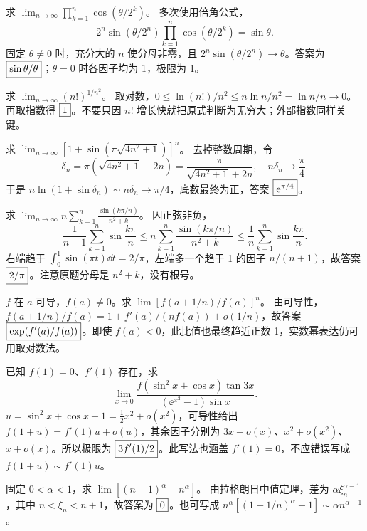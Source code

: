 求 $\lim_{n\to\infty}\prod_{k=1}^n\cos(\theta/2^k)$。
\sol 多次使用倍角公式，
\[2^n\sin(\theta/2^n)\prod_{k=1}^n\cos(\theta/2^k)=\sin\theta.\]
固定 $\theta\ne0$ 时，充分大的 $n$ 使分母非零，且 $2^n\sin(\theta/2^n)\to\theta$。答案为 $\boxed{\sin\theta/\theta}$；$\theta=0$ 时各因子均为 1，极限为 1。

求 $\lim_{n\to\infty}(n!)^{1/n^2}$。
\sol 取对数，$0\le \ln(n!)/n^2\le n\ln n/n^2=\ln n/n\to0$。再取指数得 $\boxed{1}$。不要只因 $n!$ 增长快就把原式判断为无穷大；外部指数同样关键。

求 $\lim_{n\to\infty}[1+\sin(\pi\sqrt{4n^2+1})]^n$。
\sol 去掉整数周期，令
\[\delta_n=\pi(\sqrt{4n^2+1}-2n)=\frac\pi{\sqrt{4n^2+1}+2n},\quad n\delta_n\to\frac\pi4.\]
于是 $n\ln(1+\sin\delta_n)\sim n\delta_n\to\pi/4$，底数最终为正，答案 $\boxed{\mathrm e^{\pi/4}}$。

求 $\displaystyle\lim_{n\to\infty}n\sum_{k=1}^n\frac{\sin(k\pi/n)}{n^2+k}$。
\sol 因正弦非负，
\[\frac1{n+1}\sum_{k=1}^n\sin\frac{k\pi}n
\le n\sum_{k=1}^n\frac{\sin(k\pi/n)}{n^2+k}
\le\frac1n\sum_{k=1}^n\sin\frac{k\pi}n.\]
右端趋于 $\int_0^1\sin(\pi t)\dd t=2/\pi$，左端多一个趋于 1 的因子 $n/(n+1)$，故答案 $\boxed{2/\pi}$。注意原题分母是 $n^2+k$，没有根号。

$f$ 在 $a$ 可导，$f(a)\ne0$。求 $\lim[f(a+1/n)/f(a)]^n$。
\sol 由可导性，$f(a+1/n)/f(a)=1+f'(a)/(nf(a))+o(1/n)$，故答案
$\boxed{\exp(f'(a)/f(a))}$。即使 $f(a)<0$，此比值也最终趋近正数 1，实数幂表达仍可用取对数法。

已知 $f(1)=0$、$f'(1)$ 存在，求
\[\lim_{x\to0}\frac{f(\sin^2x+\cos x)\tan3x}{(\ee^{x^2}-1)\sin x}.\]
\sol $u=\sin^2x+\cos x-1=\tfrac12x^2+o(x^2)$，可导性给出 $f(1+u)=f'(1)u+o(u)$，其余因子分别为 $3x+o(x)$、$x^2+o(x^2)$、$x+o(x)$。所以极限为 $\boxed{3f'(1)/2}$。此写法也涵盖 $f'(1)=0$，不应错误写成 $f(1+u)\sim f'(1)u$。

固定 $0<\alpha<1$，求 $\lim[(n+1)^\alpha-n^\alpha]$。
\sol 由拉格朗日中值定理，差为 $\alpha\xi_n^{\alpha-1}$，其中 $n<\xi_n<n+1$，故答案为 $\boxed{0}$。也可写成 $n^\alpha[(1+1/n)^\alpha-1]\sim\alpha n^{\alpha-1}$。

